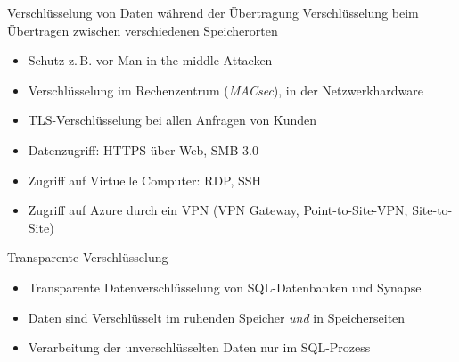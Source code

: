 \begin{flashcard}[Definition]{Verschlüsselung von Daten während der Übertragung}
  Verschlüsselung beim Übertragen zwischen verschiedenen Speicherorten
  \begin{itemize}
    \item Schutz z.\,B. vor Man-in-the-middle-Attacken
    \item Verschlüsselung im Rechenzentrum (\emph{MACsec}), in der Netzwerkhardware
    \item TLS-Verschlüsselung bei allen Anfragen von Kunden
    \item Datenzugriff: HTTPS über Web, SMB 3.0
    \item Zugriff auf Virtuelle Computer: RDP, SSH
    \item Zugriff auf Azure durch ein VPN (VPN Gateway, Point-to-Site-VPN, Site-to-Site)
  \end{itemize}
\end{flashcard}

\begin{flashcard}[Definition]{Transparente Verschlüsselung}
  \begin{itemize}
    \item Transparente Datenverschlüsselung von SQL-Datenbanken und Synapse
    \item Daten sind Verschlüsselt im ruhenden Speicher \emph{und} in Speicherseiten
    \item Verarbeitung der unverschlüsselten Daten nur im SQL-Prozess
  \end{itemize}
\end{flashcard}

